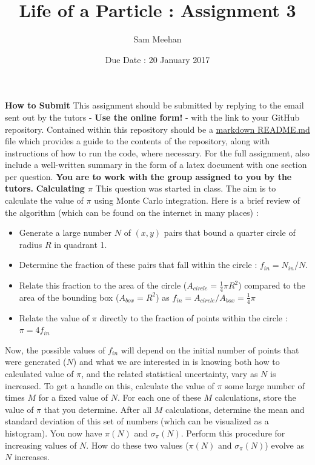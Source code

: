 \documentclass[12pt]{article}
\title{Life of a Particle : Assignment 3}
\author{Sam Meehan}
\date{Due Date : 20 January 2017}
\begin{document}
\maketitle

\textbf{How to Submit}
\newline
This assignment should be submitted by replying to the email sent out by the tutors - \textbf{Use the online form!} - with the link to your GitHub repository.  Contained within this repository should be a \href{https://github.com/adam-p/markdown-here/wiki/Markdown-Cheatsheet}{markdown README.md} file which provides a guide to the contents of the repository, along with instructions of how to run the code, where necessary.  For the full assignment, also include a well-written summary in the form of a latex document with one section per question.
\newline
\newline
\textbf{You are to work with the group assigned to you by the tutors.}
\newline
\newline
\textbf{Calculating $\pi$} 
\newline
\newline
This question was started in class.  The aim is to calculate the value of $\pi$ using Monte Carlo integration.  Here is a brief review of the algorithm (which can be found on the internet in many places) :
\begin{itemize}[noitemsep]
\item Generate a large number $N$ of $(x,y)$ pairs that bound a quarter circle of radius $R$ in quadrant 1.
\item Determine the fraction of these pairs that fall within the circle : $f_{in}=N_{in}/N$.
\item Relate this fraction to the area of the circle ($A_{circle}=\frac{1}{4}\pi R^2$) compared to the area of the bounding box ($A_{box}=R^2$) as $f_{in}=A_{circle}/A_{box}=\frac{1}{4}\pi$
\item Relate the value of $\pi$ directly to the fraction of points within the circle : $\pi=4f_{in}$
\end{itemize}
Now, the possible values of $f_{in}$ will depend on the initial number of points that were generated ($N$) and what we are interested in is knowing both how to calculated value of $\pi$, and the related statistical uncertainty, vary as $N$ is increased.
\newline
\newline
To get a handle on this, calculate the value of $\pi$ some large number of times $M$ for a fixed value of $N$.  For each one of these $M$ calculations, store the value of $\pi$ that you determine.  After all $M$ calculations, determine the mean and standard deviation of this set of numbers (which can be visualized as a histogram).  You now have $\pi(N)$ and $\sigma_{\pi}(N)$.  Perform this procedure for increasing values of $N$.  How do these two values ($\pi(N)$ and $\sigma_{\pi}(N)$) evolve as $N$ increases.
\end{document}
